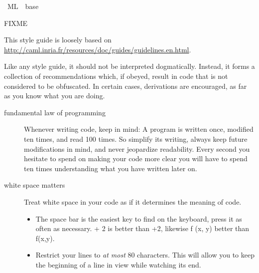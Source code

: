 %
\begin{isabellebody}%
\def\isabellecontext{ML}%
%
\isadelimtheory
\isanewline
\isanewline
%
\endisadelimtheory
%
\isatagtheory
{}\isamarkupfalse%
\ {\isachardoublequoteopen}ML{\isachardoublequoteclose}\ \ base\ %
\endisatagtheory
{\isafoldtheory}%
%
\isadelimtheory
%
\endisadelimtheory
%
\isamarkuptrue%
%
\begin{isamarkuptext}%
FIXME%
\end{isamarkuptext}%
\isamarkuptrue%
%
\begin{isamarkuptext}%
This style guide is loosely based on
  \url{http://caml.inria.fr/resources/doc/guides/guidelines.en.html}.

  Like any style guide, it should not be interpreted dogmatically.
  Instead, it forms a collection of recommendations which,
  if obeyed, result in code that is not considered to be
  obfuscated.  In certain cases, derivations are encouraged,
  as far as you know what you are doing.

  \begin{description}

    \item[fundamental law of programming]
      Whenever writing code, keep in mind: A program is
      written once, modified ten times, and read
      100 times.  So simplify its writing,
      always keep future modifications in mind,
      and never jeopardize readability.  Every second you hesitate
      to spend on making your code more clear you will
      have to spend ten times understanding what you have
      written later on.

    \item[white space matters]
      Treat white space in your code as if it determines
      the meaning of code.

      \begin{itemize}

        \item The space bar is the easiest key to find on the keyboard,
          press it as often as necessary. { + 2} is better
          than {+2}, likewise {\ttfamily f (x, y)}
          better than {\ttfamily f(x,y)}.

        \item Restrict your lines to \emph{at most} 80 characters.
          This will allow you to keep the beginning of a line
          in view while watching its end.


\end{itemize}
\end{description}
\end{isamarkuptext}
\end{isabellebody}
